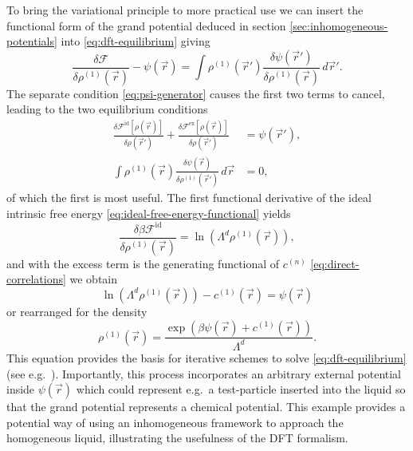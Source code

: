 To bring the variational principle to more practical use we can insert the functional form of the grand potential deduced in section \ref{sec:inhomogeneous-potentials} into \eqref{eq:dft-equilibrium} giving
\begin{equation*}
  \frac{\delta \mathcal{F}}{\delta \rho^{(1)}(\vec{r})}
  - \psi(\vec{r})
  =
  \int
  \rho^{(1)}(\vec{r}') \frac{\delta \psi(\vec{r}')}{\delta \rho^{(1)}(\vec{r})}
  \, d\vec{r}'.
\end{equation*}
The separate condition \eqref{eq:psi-generator} causes the first two terms to cancel, leading to the two equilibrium conditions
\begin{subequations}
  \begin{align}
    \label{eq:fmt-psi-equilibrium}
    \frac{\delta \mathcal{F}^\mathrm{id}[\rho(\vec{r})]}{\delta \rho(\vec{r}')}
    + \frac{\delta \mathcal{F}^\mathrm{ex}[\rho(\vec{r})]}{\delta \rho(\vec{r}')}
    &=
    \psi(\vec{r}'),
    \\
    \int
    \rho^{(1)}(\vec{r}) \frac{\delta \psi(\vec{r})}{\delta \rho^{(1)}(\vec{r}')}
    \, d\vec{r}
    &=
    0,
  \end{align}
\end{subequations}
of which the first is most useful.
The first functional derivative of the ideal intrinsic free energy \eqref{eq:ideal-free-energy-functional} yields
\begin{equation*}
  \frac{
    \delta \beta \mathcal{F}^\mathrm{id}
  }{
    \delta \rho^{(1)}(\vec{r})
  }
  =
  \ln{(\Lambda^d \rho^{(1)}(\vec{r}))},
\end{equation*}
and with the excess term is the generating functional of $c^{(n)}$ \eqref{eq:direct-correlations} we obtain
\begin{equation*}
  \ln{(\Lambda^d \rho^{(1)}(\vec{r}))}
  - c^{(1)}(\vec{r})
  =
  \psi(\vec{r})
\end{equation*}
or rearranged for the density
\begin{equation}\label{eq:equilibrium-density}
  \rho^{(1)}(\vec{r})
  =
  \frac{
    \exp{\left(\beta\psi(\vec{r}) + c^{(1)}(\vec{r})\right)}
  }{ \Lambda^d }.
\end{equation}
This equation provides the basis for iterative schemes to solve \eqref{eq:dft-equilibrium} (see e.g.\ \cite{RothJPCM2010}).
Importantly, this process incorporates an arbitrary external potential inside $\psi(\vec{r})$ which could represent e.g.\ a test-particle inserted into the liquid so that the grand potential represents a chemical potential.
This example provides a potential way of using an inhomogeneous framework to approach the homogeneous liquid, illustrating the usefulness of the DFT formalism.

